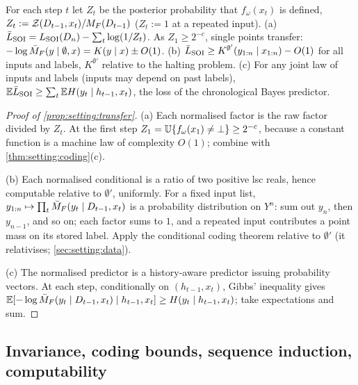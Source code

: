 \begin{proposition}\label{prop:setting:transfer}
For each step $t$ let $Z_t$ be the posterior probability that $f_\omega(x_t)$ is defined, $Z_t:=\mathcal{Z}(D_{t-1},x_t)/M_{F}(D_{t-1})$ ($Z_t:=1$ at a repeated input).
(a) $\bar{L}_{\mathrm{SOI}}=L_{\mathrm{SOI}}(D_n)-\sum_t\log(1/Z_t)$. As $Z_1\ge2^{-c}$, single points transfer: $-\log\bar{M}_{F}(y\mid\emptyset,x)=K(y\mid x)\pm O(1)$.
(b) $\bar{L}_{\mathrm{SOI}}\ge K^{\emptyset'}(y_{1:n}\mid x_{1:n})-O(1)$ for all inputs and labels, $K^{\emptyset'}$ relative to the halting problem.
(c) For any joint law of inputs and labels (inputs may depend on past labels), $\mathbb{E}\bar{L}_{\mathrm{SOI}}\ge\sum_t\mathbb{E} H(y_t\mid h_{t-1},x_t)$, the loss of the chronological Bayes predictor.
\end{proposition}

\begin{proof}[Proof of \cref{prop:setting:transfer}]
(a) Each normalised factor is the raw factor divided by $Z_t$. At the first step $Z_1=\mathbb{U}\{f_\omega(x_1)\ne\bot\}\ge2^{-c}$, because a constant function is a machine law of complexity $O(1)$; combine with \cref{thm:setting:coding}(c).

(b) Each normalised conditional is a ratio of two positive lsc reals, hence computable relative to $\emptyset'$, uniformly. For a fixed input list, $y_{1:n}\mapsto\prod_t\bar{M}_{F}(y_t\mid D_{t-1},x_t)$ is a probability distribution on $Y^n$: sum out $y_n$, then $y_{n-1}$, and so on; each factor sums to $1$, and a repeated input contributes a point mass on its stored label. Apply the conditional coding theorem relative to $\emptyset'$ (it relativises; \cref{sec:setting:data}).

(c) The normalised predictor is a history-aware predictor issuing probability vectors. At each step, conditionally on $(h_{t-1},x_t)$, Gibbs' inequality gives $\mathbb{E}[-\log\bar{M}_{F}(y_t\mid D_{t-1},x_t)\mid h_{t-1},x_t]\ge H(y_t\mid h_{t-1},x_t)$; take expectations and sum.
\end{proof}

\subsection{Invariance, coding bounds, sequence induction, computability}\label{app:setting:basic}

